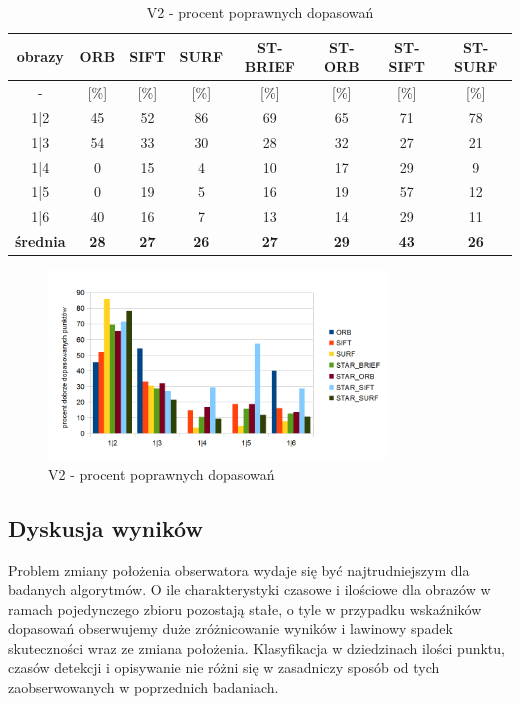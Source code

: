 \begin{table}[htbp]
  \centering
  \caption{V2 - procent poprawnych dopasowań}
    \begin{tabular}{|c|c|c|c|c|c|c|c|}\hline
    obrazy & \textbf{ORB} & \textbf{SIFT} & \textbf{SURF} & \textbf{ST-BRIEF} & \textbf{ST-ORB} & \textbf{ST-SIFT} & \textbf{ST-SURF} \\\hline
     - & [\%] & [\%] & [\%] & [\%] & [\%] & [\%] & [\%] \\\hline
    1|2 & 45 & 52 & 86 & 69 & 65 & 71 & 78 \\
    1|3 & 54 & 33 & 30 & 28 & 32 & 27 & 21 \\
    1|4 & 0 & 15 & 4 & 10 & 17 & 29 & 9 \\
    1|5 & 0 & 19 & 5 & 16 & 19 & 57 & 12 \\
    1|6 & 40 & 16 & 7 & 13 & 14 & 29 & 11 \\\hline
    \textbf{średnia} & \textbf{28} & \textbf{27} & \textbf{26} & \textbf{27} & \textbf{29} & \textbf{43} & \textbf{26} \\\hline
    
    \end{tabular}%
  \label{tab:v2_m2}%
\end{table}%


\begin{figure}
\centering
\includegraphics[width=0.8\textwidth]{pict/slowik/v2/m2.png}
\caption{V2 - procent poprawnych dopasowań}
\label{fig:v2_m2}
\end{figure}

\FloatBarrier

\subsection{Dyskusja wyników}
Problem zmiany położenia obserwatora wydaje się być najtrudniejszym dla badanych algorytmów. O ile charakterystyki czasowe i ilościowe dla obrazów w ramach pojedynczego zbioru pozostają stałe, o tyle w przypadku wskaźników dopasowań obserwujemy duże zróżnicowanie wyników i lawinowy spadek skuteczności wraz ze zmiana położenia. Klasyfikacja w dziedzinach ilości punktu, czasów detekcji i opisywanie nie różni się w zasadniczy sposób od tych zaobserwowanych w poprzednich badaniach.

